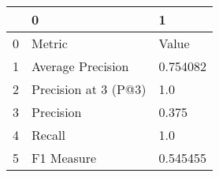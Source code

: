 \begin{tabular}{lll}
\toprule
{} &                     0 &         1 \\
\midrule
0 &                Metric &     Value \\
1 &     Average Precision &  0.754082 \\
2 &  Precision at 3 (P@3) &       1.0 \\
3 &             Precision &     0.375 \\
4 &                Recall &       1.0 \\
5 &            F1 Measure &  0.545455 \\
\bottomrule
\end{tabular}
